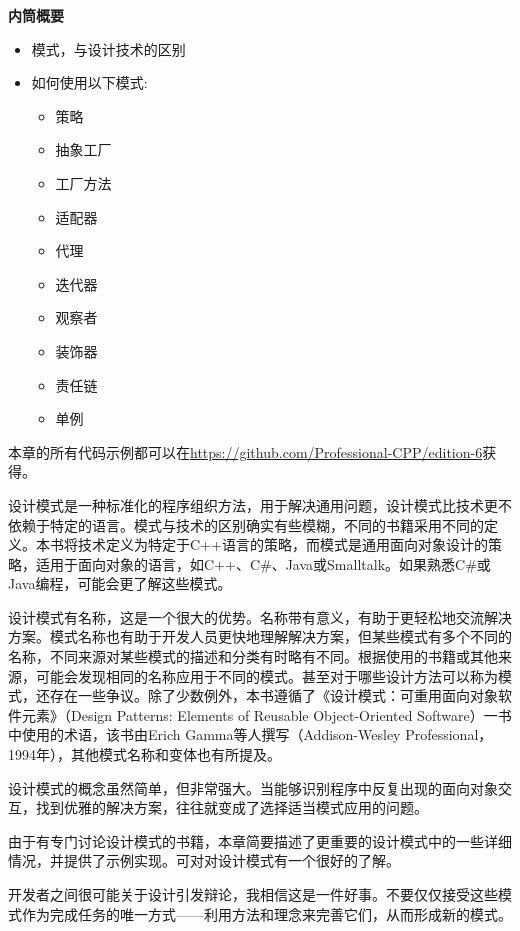 \noindent
\textbf{内筒概要}

\begin{itemize}
\item
模式，与设计技术的区别

\item
如何使用以下模式:

\begin{itemize}
\item
策略

\item
抽象工厂

\item
工厂方法

\item
适配器

\item
代理

\item
迭代器

\item
观察者

\item
装饰器

\item
责任链

\item
单例
\end{itemize}
\end{itemize}

本章的所有代码示例都可以在\url{https://github.com/Professional-CPP/edition-6}获得。

设计模式是一种标准化的程序组织方法，用于解决通用问题，设计模式比技术更不依赖于特定的语言。模式与技术的区别确实有些模糊，不同的书籍采用不同的定义。本书将技术定义为特定于C++语言的策略，而模式是通用面向对象设计的策略，适用于面向对象的语言，如C++、C\#、Java或Smalltalk。如果熟悉C\#或Java编程，可能会更了解这些模式。

设计模式有名称，这是一个很大的优势。名称带有意义，有助于更轻松地交流解决方案。模式名称也有助于开发人员更快地理解解决方案，但某些模式有多个不同的名称，不同来源对某些模式的描述和分类有时略有不同。根据使用的书籍或其他来源，可能会发现相同的名称应用于不同的模式。甚至对于哪些设计方法可以称为模式，还存在一些争议。除了少数例外，本书遵循了《设计模式：可重用面向对象软件元素》（Design Patterns: Elements of Reusable Object-Oriented Software）一书中使用的术语，该书由Erich Gamma等人撰写（Addison-Wesley Professional，1994年），其他模式名称和变体也有所提及。

设计模式的概念虽然简单，但非常强大。当能够识别程序中反复出现的面向对象交互，找到优雅的解决方案，往往就变成了选择适当模式应用的问题。

由于有专门讨论设计模式的书籍，本章简要描述了更重要的设计模式中的一些详细情况，并提供了示例实现。可对对设计模式有一个很好的了解。

开发者之间很可能关于设计引发辩论，我相信这是一件好事。不要仅仅接受这些模式作为完成任务的唯一方式——利用方法和理念来完善它们，从而形成新的模式。









